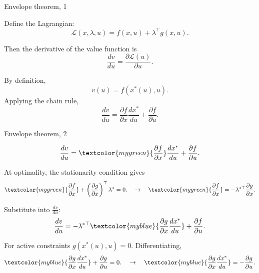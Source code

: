 \documentclass{beamer}
\begin{document}
\begin{frame}{Envelope theorem, 1}
	\begin{flushleft}
		
		Define the Lagrangian:
		\begin{equation}
			\mathcal{L}(x,\lambda,u) = f(x,u) + \lambda^\top g(x,u).
		\end{equation}
		
		Then the derivative of the value function is
		\begin{equation*}
			\boxed{
			\frac{dv}{du}
			=
			\frac{\partial \mathcal{L}(u)}{\partial u}.}
		\end{equation*}
		
		By definition,
		\begin{equation}
			v(u) = f(x^*(u), u).
		\end{equation}
		Applying the chain rule,
		\begin{equation}
			\frac{dv}{du}
			=
			\frac{\partial f}{\partial x} \frac{dx^*}{du}
			+
			\frac{\partial f}{\partial u}.
		\end{equation}
		
	\end{flushleft}
\end{frame}



\begin{frame}{Envelope theorem, 2}
	\begin{flushleft}
		
		\begin{equation}
			\frac{dv}{du}
			=
			\textcolor{mygreen}{\frac{\partial f}{\partial x}} \frac{dx^*}{du}
			+
			\frac{\partial f}{\partial u}.
		\end{equation}
		
		At optimality, the stationarity condition gives
		\begin{equation}
			\textcolor{mygreen}{\frac{\partial f}{\partial x}} 
			+
			\left( \frac{\partial g}{\partial x} \right)^\top \lambda^*
			=
			0. 
			\quad \rightarrow \quad
			\textcolor{mygreen}{\frac{\partial f}{\partial x}} 
			=
			- \lambda^{*\top} \frac{\partial g}{\partial x}.
		\end{equation}
		
		Substitute into $\frac{dv}{du}$:
		\begin{equation}
			\frac{dv}{du}
			=
			- \lambda^{*\top} 
			\textcolor{myblue}{ \frac{\partial g}{\partial x} \frac{dx^*}{du}}
			+
			\frac{\partial f}{\partial u}.
		\end{equation}
		
		For active constraints $g(x^*(u), u) = 0.$
		Differentiating,
		\begin{equation}
			\textcolor{myblue}{\frac{\partial g}{\partial x} \frac{dx^*}{du}}
			+
			\frac{\partial g}{\partial u}
			=
			0.
			\quad \rightarrow \quad
			\textcolor{myblue}{\frac{\partial g}{\partial x} \frac{dx^*}{du}}
			=
			- \frac{\partial g}{\partial u}.
		\end{equation}
		
	\end{flushleft}
\end{frame}
\end{document}
